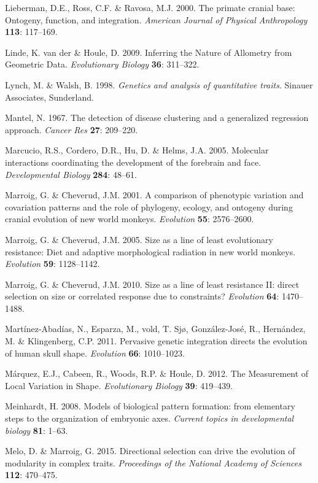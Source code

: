 \documentclass[12pt,]{article}
\begin{document}
Lieberman, D.E., Ross, C.F. \& Ravosa, M.J. 2000. The primate cranial
base: Ontogeny, function, and integration. \emph{American Journal of
Physical Anthropology} \textbf{113}: 117--169.

Linde, K. van der \& Houle, D. 2009. Inferring the Nature of Allometry
from Geometric Data. \emph{Evolutionary Biology} \textbf{36}: 311--322.

Lynch, M. \& Walsh, B. 1998. \emph{Genetics and analysis of quantitative
traits}. Sinauer Associates, Sunderland.

Mantel, N. 1967. The detection of disease clustering and a generalized
regression approach. \emph{Cancer Res} \textbf{27}: 209--220.

Marcucio, R.S., Cordero, D.R., Hu, D. \& Helms, J.A. 2005. Molecular
interactions coordinating the development of the forebrain and face.
\emph{Developmental Biology} \textbf{284}: 48--61.

Marroig, G. \& Cheverud, J.M. 2001. A comparison of phenotypic variation
and covariation patterns and the role of phylogeny, ecology, and
ontogeny during cranial evolution of new world monkeys. \emph{Evolution}
\textbf{55}: 2576--2600.

Marroig, G. \& Cheverud, J.M. 2005. Size as a line of least evolutionary
resistance: Diet and adaptive morphological radiation in new world
monkeys. \emph{Evolution} \textbf{59}: 1128--1142.

Marroig, G. \& Cheverud, J.M. 2010. Size as a line of least resistance
II: direct selection on size or correlated response due to constraints?
\emph{Evolution} \textbf{64}: 1470--1488.

Martínez-Abadías, N., Esparza, M., vold, T. Sjø, González-José, R.,
Hernández, M. \& Klingenberg, C.P. 2011. Pervasive genetic integration
directs the evolution of human skull shape. \emph{Evolution}
\textbf{66}: 1010--1023.

Márquez, E.J., Cabeen, R., Woods, R.P. \& Houle, D. 2012. The
Measurement of Local Variation in Shape. \emph{Evolutionary Biology}
\textbf{39}: 419--439.

Meinhardt, H. 2008. Models of biological pattern formation: from
elementary steps to the organization of embryonic axes. \emph{Current
topics in developmental biology} \textbf{81}: 1--63.

Melo, D. \& Marroig, G. 2015. Directional selection can drive the
evolution of modularity in complex traits. \emph{Proceedings of the
National Academy of Sciences} \textbf{112}: 470--475.
\end{document}
